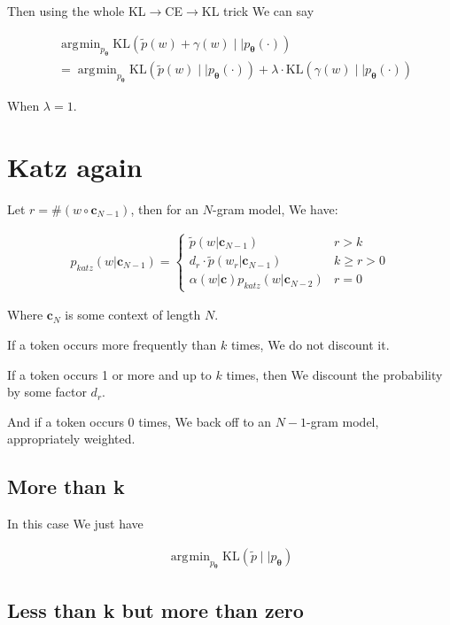 \documentclass{article}
\DeclareMathOperator*{\argmin}{\arg\!\min}
\newcommand{\KL}{\mathrm{KL}}
\newcommand{\vtheta}{\boldsymbol{\theta}}
\newcommand{\model}{p_{\vtheta}}
\newcommand{\context}{\boldsymbol{c}}
\begin{document}
	    Then using the whole KL$\to$CE$\to$KL trick We can say
	    
		\begin{align}
	    	&\argmin_{\model}\KL( \tilde{p}(w) + \gamma(w) \mid\mid \model(\cdot)) \\
	    	&= \argmin_{\model}\KL( \tilde{p}(w)  \mid\mid \model(\cdot)) + \lambda\cdot \KL(\gamma(w) \mid\mid \model(\cdot))
	    \end{align}
	    
	    When $\lambda=1$.
		
\section{Katz again}

	Let $r = \#(w\circ\context_{N-1})$, then for an $N$-gram model, We have:
	
	\begin{align}
		p_{katz}(w|\context_{N-1}) = \begin{cases} 
										\tilde{p}(w|\context_{N-1}) & r > k\\
										d_r \cdot \tilde{p}(w_r|\context_{N-1}) & k \ge r > 0\\
										\alpha(w|\context)p_{katz}(w|\context_{N-2}) & r =0
									\end{cases}
	\end{align}
	
	Where $\context_{N}$ is some context of length $N$.
	
	If a token occurs more frequently than $k$ times, We do not discount it.
	
	If a token occurs 1 or more and up to $k$ times, then We discount the probability by some factor $d_r$.
	
	And if a token occurs 0 times, We back off to an $N-1$-gram model, appropriately weighted.
	
	\subsection{More than k}
	
		In this case We just have
		
		\begin{align}
			\argmin_{\model}\KL(\tilde{p} \mid\mid \model)
		\end{align}
		
	\subsection{Less than k but more than zero}
	
\end{document}
